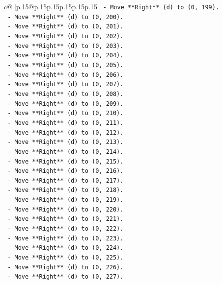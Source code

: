 \documentclass{article}
\begin{document}
{\begin{supertabular}{c@{$\;$}|p{.15\linewidth}@{}p{.15\linewidth}p{.15\linewidth}p{.15\linewidth}p{.15\linewidth}p{.15\linewidth}}
{{{\texttt{    {-} Move **Right** (d) to (0, 199).} \\
\texttt{    {-} Move **Right** (d) to (0, 200).} \\
\texttt{    {-} Move **Right** (d) to (0, 201).} \\
\texttt{    {-} Move **Right** (d) to (0, 202).} \\
\texttt{    {-} Move **Right** (d) to (0, 203).} \\
\texttt{    {-} Move **Right** (d) to (0, 204).} \\
\texttt{    {-} Move **Right** (d) to (0, 205).} \\
\texttt{    {-} Move **Right** (d) to (0, 206).} \\
\texttt{    {-} Move **Right** (d) to (0, 207).} \\
\texttt{    {-} Move **Right** (d) to (0, 208).} \\
\texttt{    {-} Move **Right** (d) to (0, 209).} \\
\texttt{    {-} Move **Right** (d) to (0, 210).} \\
\texttt{    {-} Move **Right** (d) to (0, 211).} \\
\texttt{    {-} Move **Right** (d) to (0, 212).} \\
\texttt{    {-} Move **Right** (d) to (0, 213).} \\
\texttt{    {-} Move **Right** (d) to (0, 214).} \\
\texttt{    {-} Move **Right** (d) to (0, 215).} \\
\texttt{    {-} Move **Right** (d) to (0, 216).} \\
\texttt{    {-} Move **Right** (d) to (0, 217).} \\
\texttt{    {-} Move **Right** (d) to (0, 218).} \\
\texttt{    {-} Move **Right** (d) to (0, 219).} \\
\texttt{    {-} Move **Right** (d) to (0, 220).} \\
\texttt{    {-} Move **Right** (d) to (0, 221).} \\
\texttt{    {-} Move **Right** (d) to (0, 222).} \\
\texttt{    {-} Move **Right** (d) to (0, 223).} \\
\texttt{    {-} Move **Right** (d) to (0, 224).} \\
\texttt{    {-} Move **Right** (d) to (0, 225).} \\
\texttt{    {-} Move **Right** (d) to (0, 226).} \\
\texttt{    {-} Move **Right** (d) to (0, 227).} \\
}}}
\end{supertabular}}
\end{document}
